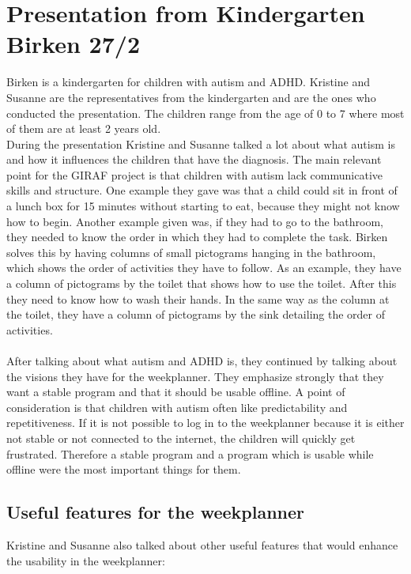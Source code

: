 \section{Presentation from Kindergarten Birken 27/2}\label{presentation-from-birken}
Birken is a kindergarten for children with autism and ADHD.
Kristine and Susanne are the representatives from the kindergarten and are the ones who conducted the presentation.
The children range from the age of 0 to 7 where most of them are at least 2 years old.
\\
During the presentation Kristine and Susanne talked a lot about what autism is and how it influences the children that have the diagnosis.
The main relevant point for the GIRAF project is that children with autism lack communicative skills and structure. 
One example they gave was that a child could sit in front of a lunch box for 15 minutes without starting to eat, because they might not know how to begin.
Another example given was, if they had to go to the bathroom, they needed to know the order in which they had to complete the task.
Birken solves this by having columns of small pictograms hanging in the bathroom, which shows the order of activities they have to follow. 
As an example, they have a column of pictograms by the toilet that shows how to use the toilet.
After this they need to know how to wash their hands.
In the same way as the column at the toilet, they have a column of pictograms by the sink detailing the order of activities.
\\\\
After talking about what autism and ADHD is, they continued by talking about the visions they have for the weekplanner.
They emphasize strongly that they want a stable program and that it should be usable offline.
A point of consideration is that children with autism often like predictability and repetitiveness. 
If it is not possible to log in to the weekplanner because it is either not stable or not connected to the internet, the children will quickly get frustrated.
Therefore a stable program and a program which is usable while offline were the most important things for them.

\subsection{Useful features for the weekplanner}
Kristine and Susanne also talked about other useful features that would enhance the usability in the weekplanner:

